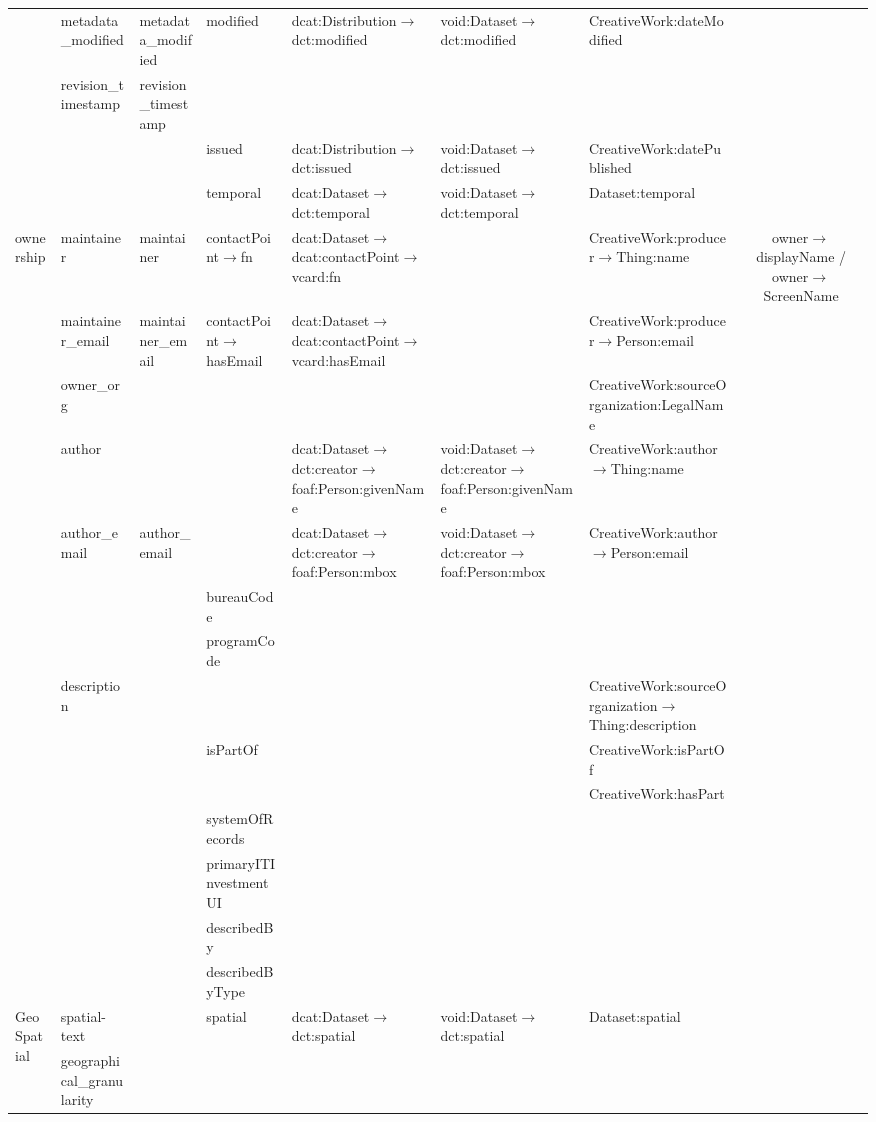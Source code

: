 \documentclass[runningheads,a4paper]{llncs}
\begin{document}
{\begin{longtable}{|p{1.5cm}|l|l|l|p{3cm}|m{3cm}|m{3cm}|c|}
 & metadata\_modified & metadata\_modified & modified & dcat:Distribution$\rightarrow$dct:modified & void:Dataset$\rightarrow$dct:modified & CreativeWork:dateModified & \tabularnewline
\cline{2-8}
 & revision\_timestamp & revision\_timestamp &  &  &  &  & \tabularnewline
\cline{2-8}
 &  &  & issued & dcat:Distribution$\rightarrow$dct:issued & void:Dataset$\rightarrow$dct:issued & CreativeWork:datePublished & \tabularnewline
\cline{2-8}
 &  &  & temporal & dcat:Dataset$\rightarrow$dct:temporal & void:Dataset$\rightarrow$dct:temporal & Dataset:temporal & \tabularnewline
\hline
\hline
\multirow{14}{2cm}{ownership} & maintainer & maintainer & contactPoint$\rightarrow$fn & dcat:Dataset$\rightarrow$dcat:contactPoint$\rightarrow$vcard:fn &  & CreativeWork:producer$\rightarrow$Thing:name & owner$\rightarrow$displayName / owner$\rightarrow$ScreenName\tabularnewline
\cline{2-8}
 & maintainer\_email & maintainer\_email & contactPoint$\rightarrow$hasEmail & dcat:Dataset$\rightarrow$dcat:contactPoint$\rightarrow$vcard:hasEmail &  & CreativeWork:producer$\rightarrow$Person:email & \tabularnewline
\cline{2-8}
 & owner\_org &  &  &  &  & CreativeWork:sourceOrganization:LegalName & \tabularnewline
\cline{2-8}
 & author &  &  & dcat:Dataset$\rightarrow$dct:creator$\rightarrow$foaf:Person:givenName & void:Dataset$\rightarrow$dct:creator$\rightarrow$foaf:Person:givenName & CreativeWork:author$\rightarrow$Thing:name & \tabularnewline
\cline{2-8}
 & author\_email & author\_email &  & dcat:Dataset$\rightarrow$dct:creator$\rightarrow$foaf:Person:mbox & void:Dataset$\rightarrow$dct:creator$\rightarrow$foaf:Person:mbox & CreativeWork:author$\rightarrow$Person:email & \tabularnewline
\cline{2-8}
 &  &  & bureauCode &  &  &  & \tabularnewline
\cline{2-8}
 &  &  & programCode &  &  &  & \tabularnewline
\cline{2-8}
 & description &  &  &  &  & CreativeWork:sourceOrganization$\rightarrow$Thing:description & \tabularnewline
\cline{2-8}
 &  &  & isPartOf &  &  & CreativeWork:isPartOf & \tabularnewline
\cline{2-8}
 &  &  &  &  &  & CreativeWork:hasPart & \tabularnewline
\cline{2-8}
 &  &  & systemOfRecords &  &  &  & \tabularnewline
\cline{2-8}
 &  &  & primaryITInvestmentUI &  &  &  & \tabularnewline
\cline{2-8}
 &  &  & describedBy &  &  &  & \tabularnewline
\cline{2-8}
 &  &  & describedByType &  &  &  & \tabularnewline
\hline
\hline
\multirow{6}{2cm}{GeoSpatial} & spatial-text &  & spatial & dcat:Dataset$\rightarrow$dct:spatial & void:Dataset$\rightarrow$dct:spatial & Dataset:spatial & \tabularnewline
\cline{2-8}
 & geographical\_granularity &  &  &  &  &  & \tabularnewline
\cline{2-8}

\end{longtable}}
\end{document}
